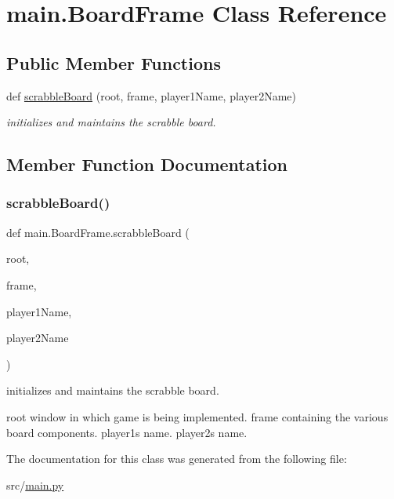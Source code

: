 \hypertarget{classmain_1_1_board_frame}{}\section{main.\+Board\+Frame Class Reference}
\label{classmain_1_1_board_frame}
\subsection*{Public Member Functions}
\begin{DoxyCompactItemize}
\item 
def \hyperlink{classmain_1_1_board_frame_a157632d7e75c3690962e873a771e4626}{scrabble\+Board} (root, frame, player1\+Name, player2\+Name)
\begin{DoxyCompactList}\small\item\em initializes and maintains the scrabble board. \end{DoxyCompactList}\end{DoxyCompactItemize}


\subsection{Member Function Documentation}
\mbox{\label{classmain_1_1_board_frame_a157632d7e75c3690962e873a771e4626}} 
\subsubsection{\texorpdfstring{scrabble\+Board()}{scrabbleBoard()}}
{\footnotesize\ttfamily def main.\+Board\+Frame.\+scrabble\+Board (\begin{DoxyParamCaption}\item[{}]{root,  }\item[{}]{frame,  }\item[{}]{player1\+Name,  }\item[{}]{player2\+Name }\end{DoxyParamCaption})}



initializes and maintains the scrabble board. 

root window in which game is being implemented.  frame containing the various board components.  player1\textquotesingle{}s name.  player2\textquotesingle{}s name. 

The documentation for this class was generated from the following file\+:\begin{DoxyCompactItemize}
\item 
src/\hyperlink{main_8py}{main.\+py}\end{DoxyCompactItemize}
